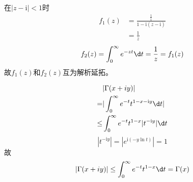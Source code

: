 \documentclass{phyasgn}
\renewcommand{\i}{\mathrm{i}}
\begin{document}
\begin{sol}[2]
    在$|z-\i|<1$时
\begin{align*}
    f_1(z)&=\frac{\frac{1}{\i}}{1-\i(z-\i)}\\
    &=\frac{1}{z}
\end{align*}
$$f_2(z)=\int_0^{\infty}e^{-zt}\d t=\frac{1}{z}=f_1(z)$$
故$f_1(z)$和$f_2(z)$互为解析延拓。
\end{sol}\par

\begin{pf}[3]
    \begin{align*}
        &|\Gamma(x+iy)|\\
        =&|\int_{0}^{\infty}e^{-t}t^{1-x-\i y}\d t|\\
        \leq& \int_{0}^{\infty}e^{-t}t^{1-x}|t^{-\i y}|\d t\\
    \end{align*}
    $$|t^{-\i y}|=|e^{\i(-y\ln t)}|=1$$
    故$$|\Gamma(x+iy)|\leq\int_{0}^{\infty}e^{-t}t^{1-x}\d t=\Gamma(x)$$
\end{pf}\par
\end{document}
